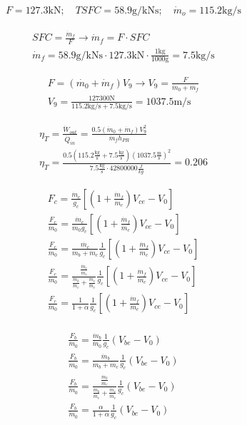 \begin{align*}
    F=127.3\text{kN}; \quad TSFC=58.9\text{g/kNs}; \quad \dot{m}_o=115.2\text{kg/s}
\end{align*}

\begin{align*}
    SFC=\frac{\dot{m}_f}{F} \rightarrow \dot{m}_f=F\cdot SFC \\
    \dot{m}_f=58.9\text{g/kNs}\cdot 127.3\text{kN}\cdot\frac{1\text{kg}}{1000\text{g}}=7.5\text{kg/s}
\end{align*}

\begin{align*}
    F=(\dot{m_0}+\dot{m}_f)V_9 \rightarrow V_9=\frac{F}{\dot{m}_0+\dot{m_f}} \\
    V_9=\frac{127300\text{N}}{115.2\text{kg/s}+7.5\text{kg/s}}=1037.5\text{m/s}
\end{align*}

\begin{align*}
    \eta_T=\frac{\dot{W}_{out}}{\dot{Q}_{in}}=\frac{0.5(\dot{m}_0+\dot{m}_f)V_9^2}{\dot{m}_fh_{PR}} \\
    \eta_T=\frac{0.5(115.2\frac{\text{kg}}{\text{s}}+7.5\frac{\text{kg}}{\text{s}})(1037.5\frac{\text{m}}{\text{s}})^2}
    {7.5\frac{\text{kg}}{\text{s}}\cdot 42800000\frac{J}{kg}}=0.206
\end{align*}

\begin{align*}
    F_c=\frac{\dot{m}_c}{g_c}\left[\left(1+\frac{\dot{m}_f}{\dot{m}_c}\right)V_{ce}-V_0\right] \\
    \frac{F_c}{\dot{m}_0}=\frac{\dot{m}_c}{\dot{m}_0g_c}\left[\left(1+\frac{\dot{m}_f}{\dot{m}_c}\right)V_{ce}-V_0\right] \\
    \frac{F_c}{\dot{m}_0}=\frac{\dot{m_c}}{\dot{m}_b+\dot{m}_c}\frac{1}{g_c}\left[\left(1+\frac{\dot{m}_f}{\dot{m}_c}\right)V_{ce}-V_0\right] \\
    \frac{F_c}{\dot{m}_0}=\frac{\frac{\dot{m}_c}{\dot{m}_c}}{\frac{\dot{m}_b}{\dot{m}_c}+\frac{\dot{m}_c}{\dot{m}_c}}
    \frac{1}{g_c}\left[\left(1+\frac{\dot{m}_f}{\dot{m}_c}\right)V_{ce}-V_0\right] \\
    \frac{F_c}{\dot{m}_0}=\frac{1}{1+\alpha}\frac{1}{g_c}\left[\left(1+\frac{\dot{m}_f}{\dot{m}_c}\right)V_{ce}-V_0\right] \\
\end{align*}

\begin{align*}
    \frac{F_b}{\dot{m}_0}=\frac{\dot{m}_b}{\dot{m}_0}\frac{1}{g_c}\left(V_{be}-V_0\right) \\
    \frac{F_b}{\dot{m}_0}=\frac{\dot{m}_b}{\dot{m}_b+\dot{m}_c}\frac{1}{g_c}\left(V_{be}-V_0\right) \\
    \frac{F_b}{\dot{m}_0}=\frac{\frac{\dot{m}_b}{\dot{m}_c}}{\frac{\dot{m}_b}{\dot{m}_c}+\frac{\dot{m}_c}{\dot{m}_c}}
    \frac{1}{g_c}\left(V_{be}-V_0\right) \\
    \frac{F_b}{\dot{m}_0}=\frac{\alpha}{1+\alpha}\frac{1}{g_c}\left(V_{be}-V_0\right) \\
\end{align*}

